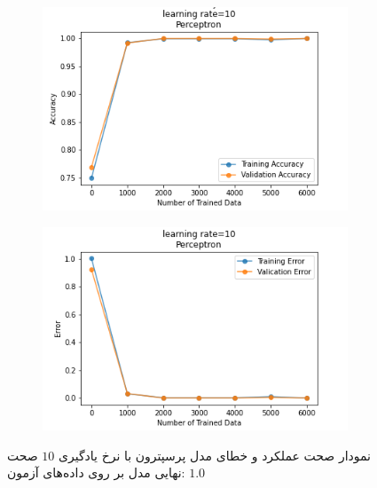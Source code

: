 \documentclass[12pt, a4paper]{article}
\begin{document}
\begin{figure}[h]
    \begin{subfigure}{0.45\linewidth}
        \centering
        \includegraphics[width=\linewidth]{images/3/perceptron/lr/acc_10.png}
    \end{subfigure}
    \hfil
    \begin{subfigure}{0.45\linewidth}
        \centering
        \includegraphics[width=\linewidth]{images/3/perceptron/lr/error_10.png}
    \end{subfigure}
    \caption{نمودار صحت عملکرد‌ و خطای مدل پرسپترون با نرخ یادگیری $10$
    \newline
    صحت نهایی مدل بر روی داده‌های آزمون: $1.0$}
\end{figure}
\end{document}
